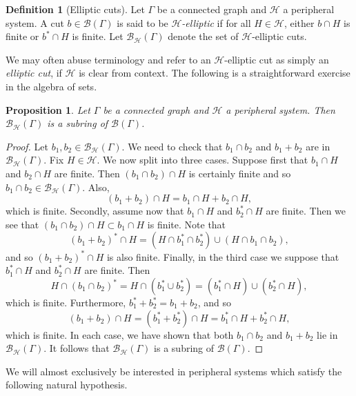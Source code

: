 \documentclass[11pt,a4paper]{amsart}
\newtheorem{proposition}[theorem]{Proposition}
\theoremstyle{definition}
\newtheorem{definition}[theorem]{Definition}
\newcommand{\per}{\mathcal{H}}
\newcommand{\br}{{\mathscr{B}}}
\begin{document}
\begin{definition}[Elliptic cuts]
    Let $\Gamma$ be a connected graph and $\per$ a peripheral system. A cut $b \in \br(\Gamma)$ is said to be \emph{$\per$-elliptic} if for all $H \in \per$, either $b \cap H$ is finite or $b^\ast \cap H$ is finite.
    Let 
    $\br_\per(\Gamma)$ denote the set of $\per$-elliptic cuts.
\end{definition}

We may often abuse terminology and refer to an $\per$-elliptic cut as simply an \emph{elliptic cut}, if $\per$ is clear from context.
The following is a straightforward exercise in the algebra of sets.

\begin{proposition}\label{prop:subring}
    Let $\Gamma$ be a connected graph and $\per$ a peripheral system. Then 
    $\br_\per (\Gamma)$ is a subring of $\br (\Gamma)$. 
\end{proposition}

\begin{proof}
    Let $b_1, b_2 \in \br_{\per}(\Gamma)$. We need to check that $b_1 \cap b_2$ and $b_1 + b_2$ are in $\br_{\per} (\Gamma)$. Fix $H \in \per$. We now split into three cases. 
    Suppose first that $b_1 \cap H$ and $b_2 \cap H$ are finite. Then $(b_1 \cap b_2) \cap H$ is certainly finite and so $b_1 \cap b_2 \in \br_\per (\Gamma)$. Also, 
    $$
    (b_1 + b_2) \cap H = b_1 \cap H + b_2 \cap H,
    $$
    which is finite.
    Secondly, assume now that $b_1 \cap H$  and $b_2 ^\ast \cap H$ are finite. Then we see that $(b_1 \cap b_2) \cap H \subset b_1 \cap H$ is finite. Note that
    $$
    (b_1 + b_2)^\ast \cap H= (H \cap b_1 ^\ast \cap b_2^\ast) \cup (H \cap b_1 \cap b_2), 
    $$
    and so $(b_1 + b_2)^\ast \cap H$ is also finite.
    Finally, in the third case we suppose that $b_1^\ast \cap H$ and $b_2 ^\ast \cap H$ are finite. Then 
    $$
    H \cap (b_1 \cap b_2)^\ast = H \cap (b_1 ^\ast \cup b_2 ^\ast ) = (b_1^\ast \cap H) \cup (b_2^\ast \cap H),
    $$
    which is finite. Furthermore, $b_1^\ast + b_2^\ast = b_1 + b_2$, and so 
    $$
    (b_1 + b_2) \cap H = (b_1 ^\ast + b_2 ^\ast ) \cap H = b_1^\ast \cap H + b_2 ^\ast \cap H, 
    $$
    which is finite. 
    In each case, we have shown that both $b_1 \cap b_2$ and $b_1 + b_2$ lie in $\br_\per (\Gamma)$. It follows that $\br_\per (\Gamma)$ is a subring of $\br (\Gamma)$. 
\end{proof}

We will almost exclusively be interested in peripheral systems which satisfy the following natural hypothesis.
\end{document}
